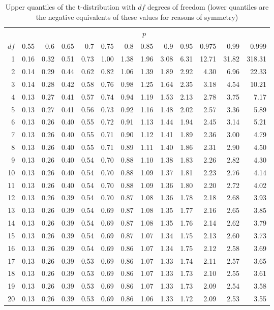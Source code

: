 \begin{table}[!ht]
\centering
\begin{tabular}{rrrrrrrrrrrrr}
   & \multicolumn{12}{c}{$p$} \\ \cline{2-13}
 $df$  & 0.55 & 0.6 & 0.65 & 0.7 & 0.75 & 0.8 & 0.85 & 0.9 & 0.95 & 0.975 & 0.99 & 0.999\\ 
  \hline
  1 & 0.16 & 0.32 & 0.51 & 0.73 & 1.00 & 1.38 & 1.96 & 3.08 & 6.31 & 12.71 & 31.82 & 318.31 \\ 
  2 & 0.14 & 0.29 & 0.44 & 0.62 & 0.82 & 1.06 & 1.39 & 1.89 & 2.92 & 4.30 & 6.96 & 22.33 \\ 
  3 & 0.14 & 0.28 & 0.42 & 0.58 & 0.76 & 0.98 & 1.25 & 1.64 & 2.35 & 3.18 & 4.54 & 10.21 \\ 
  4 & 0.13 & 0.27 & 0.41 & 0.57 & 0.74 & 0.94 & 1.19 & 1.53 & 2.13 & 2.78 & 3.75 & 7.17 \\ 
  5 & 0.13 & 0.27 & 0.41 & 0.56 & 0.73 & 0.92 & 1.16 & 1.48 & 2.02 & 2.57 & 3.36 & 5.89 \\ 
  6 & 0.13 & 0.26 & 0.40 & 0.55 & 0.72 & 0.91 & 1.13 & 1.44 & 1.94 & 2.45 & 3.14 & 5.21 \\ 
  7 & 0.13 & 0.26 & 0.40 & 0.55 & 0.71 & 0.90 & 1.12 & 1.41 & 1.89 & 2.36 & 3.00 & 4.79 \\ 
  8 & 0.13 & 0.26 & 0.40 & 0.55 & 0.71 & 0.89 & 1.11 & 1.40 & 1.86 & 2.31 & 2.90 & 4.50 \\ 
  9 & 0.13 & 0.26 & 0.40 & 0.54 & 0.70 & 0.88 & 1.10 & 1.38 & 1.83 & 2.26 & 2.82 & 4.30 \\ 
  10 & 0.13 & 0.26 & 0.40 & 0.54 & 0.70 & 0.88 & 1.09 & 1.37 & 1.81 & 2.23 & 2.76 & 4.14 \\ 
  11 & 0.13 & 0.26 & 0.40 & 0.54 & 0.70 & 0.88 & 1.09 & 1.36 & 1.80 & 2.20 & 2.72 & 4.02 \\ 
  12 & 0.13 & 0.26 & 0.39 & 0.54 & 0.70 & 0.87 & 1.08 & 1.36 & 1.78 & 2.18 & 2.68 & 3.93 \\ 
  13 & 0.13 & 0.26 & 0.39 & 0.54 & 0.69 & 0.87 & 1.08 & 1.35 & 1.77 & 2.16 & 2.65 & 3.85 \\ 
  14 & 0.13 & 0.26 & 0.39 & 0.54 & 0.69 & 0.87 & 1.08 & 1.35 & 1.76 & 2.14 & 2.62 & 3.79 \\ 
  15 & 0.13 & 0.26 & 0.39 & 0.54 & 0.69 & 0.87 & 1.07 & 1.34 & 1.75 & 2.13 & 2.60 & 3.73 \\ 
  16 & 0.13 & 0.26 & 0.39 & 0.54 & 0.69 & 0.86 & 1.07 & 1.34 & 1.75 & 2.12 & 2.58 & 3.69 \\ 
  17 & 0.13 & 0.26 & 0.39 & 0.53 & 0.69 & 0.86 & 1.07 & 1.33 & 1.74 & 2.11 & 2.57 & 3.65 \\ 
  18 & 0.13 & 0.26 & 0.39 & 0.53 & 0.69 & 0.86 & 1.07 & 1.33 & 1.73 & 2.10 & 2.55 & 3.61 \\ 
  19 & 0.13 & 0.26 & 0.39 & 0.53 & 0.69 & 0.86 & 1.07 & 1.33 & 1.73 & 2.09 & 2.54 & 3.58 \\ 
  20 & 0.13 & 0.26 & 0.39 & 0.53 & 0.69 & 0.86 & 1.06 & 1.33 & 1.72 & 2.09 & 2.53 & 3.55 \\  
   \hline
\end{tabular}
\caption{Upper quantiles of the t-distribution with $df$ degrees of freedom (lower quantiles are the negative equivalents of these values for reasons of symmetry)}
\label{tab:t}
\end{table}

